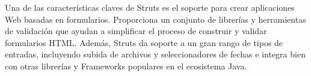             Una de las características claves de Struts es el soporte para crear aplicaciones Web basadas en formularios. Proporciona un conjunto de librerías y herramientas de validación que ayudan a simplificar el proceso de construir y validar formularios HTML. Además, Struts da soporte a un gran rango de tipos de entradas, incluyendo subida de archivos y seleccionadores de fechas e integra bien con otras librerías y Frameworks populares en el ecosistema Java. \cite{brown2019struts}
    